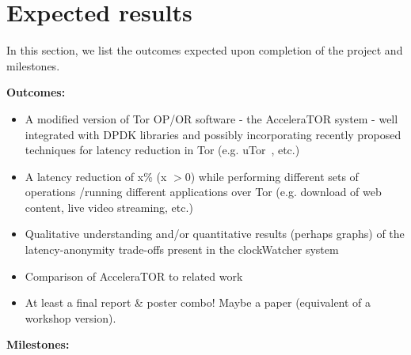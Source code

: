 \documentclass[conference]{IEEEtran}
\begin{document}
\section{Expected results}
In this section, we list the outcomes expected upon completion of the project 
and milestones.



\textbf{Outcomes:}

\begin{itemize}
	
	\item A modified version of Tor OP\slash OR software - the AcceleraTOR 
	system - well integrated with DPDK libraries and possibly incorporating 
	recently proposed techniques for latency reduction in Tor (e.g. 
	uTor~\cite{179191}, etc.)
	
	\item A latency reduction of x\% (x $> 0$) while performing different sets 
	of operations \slash running different applications over Tor (e.g. download 
	of web content, live video streaming, etc.)
	
	\item Qualitative understanding and/or quantitative results (perhaps graphs) of the 
	latency-anonymity trade-offs present in the clockWatcher system
	
	\item Comparison of AcceleraTOR to related work 
	
	\item At least a final report \& poster combo! Maybe a paper (equivalent of a workshop version).

\end{itemize}

\textbf{Milestones:}
\end{document}
